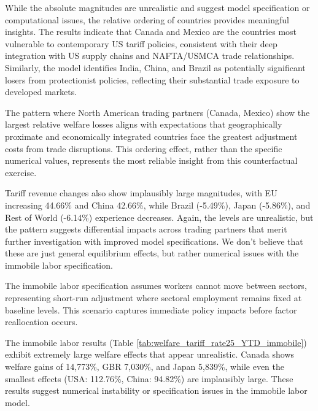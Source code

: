 While the absolute magnitudes are unrealistic and suggest model specification or computational issues, the relative ordering of countries provides meaningful insights. The results indicate that Canada and Mexico are the countries most vulnerable to contemporary US tariff policies, consistent with their deep integration with US supply chains and NAFTA/USMCA trade relationships. Similarly, the model identifies India, China, and Brazil as potentially significant losers from protectionist policies, reflecting their substantial trade exposure to developed markets.

\begin{landscape}
    \vspace*{\fill}
    
    \vspace*{\fill}
\end{landscape}
The pattern where North American trading partners (Canada, Mexico) show the largest relative welfare losses aligns with expectations that geographically proximate and economically integrated countries face the greatest adjustment costs from trade disruptions. This ordering effect, rather than the specific numerical values, represents the most reliable insight from this counterfactual exercise.

Tariff revenue changes also show implausibly large magnitudes, with EU increasing 44.66\% and China 42.66\%, while Brazil (-5.49\%), Japan (-5.86\%), and Rest of World (-6.14\%) experience decreases. Again, the levels are unrealistic, but the pattern suggests differential impacts across trading partners that merit further investigation with improved model specifications. We don't believe that these are just general equilibrium effects, but rather numerical issues with the immobile labor specification.

The immobile labor specification assumes workers cannot move between sectors, representing short-run adjustment where sectoral employment remains fixed at baseline levels. This scenario captures immediate policy impacts before factor reallocation occurs.

The immobile labor results (Table \ref{tab:welfare_tariff_rate25_YTD_immobile}) exhibit extremely large welfare effects that appear unrealistic. Canada shows welfare gains of 14,773\%, GBR 7,030\%, and Japan 5,839\%, while even the smallest effects (USA: 112.76\%, China: 94.82\%) are implausibly large. These results suggest numerical instability or specification issues in the immobile labor model.

